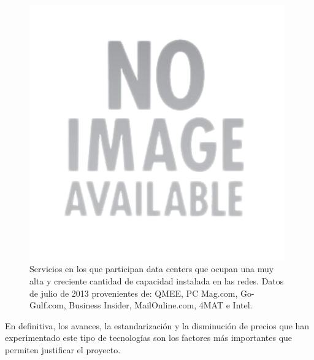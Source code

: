 \begin{figure}[H]
  \centering
  \includegraphics[width=11cm]{Imagenes/servicios.png}
  \caption{Servicios en los que participan data centers que ocupan una
    muy alta y creciente cantidad de capacidad instalada en las
    redes. Datos de julio de 2013 provenientes de: QMEE, PC Mag.com,
    Go-Gulf.com, Business Insider, MailOnline.com, 4MAT e Intel.}
  \label{fig:servicios}
\end{figure}

En definitiva, los avances, la estandarización y la disminución de 
precios que han experimentado este tipo de tecnologías son los factores 
más importantes que permiten justificar el proyecto. 
